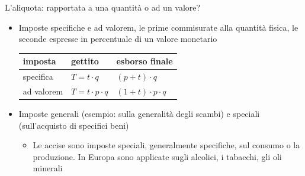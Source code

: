 \documentclass[11pt]{beamer}
\begin{document}
\begin{frame}{L'aliquota: rapportata a una quantità o ad un valore?}
\begin{itemize}
\item Imposte \alert{specifiche} e \alert{ad valorem}, le prime commisurate alla quantità
fisica, le seconde espresse in percentuale di un valore monetario
\begin{center}
\begin{tabular}{lll}
imposta & gettito & esborso finale\\[0pt]
\hline
specifica & $T = t\cdot q$ & $(p+t)\cdot q$\\[0pt]
ad valorem & $T = t\cdot p\cdot q$ & $(1+t)\cdot p\cdot q$\\[0pt]
\end{tabular}
\end{center}
\item Imposte \alert{generali} (esempio: sulla generalità degli scambi) e \alert{speciali}
(sull'acquisto di specifici beni)
\begin{itemize}
\item Le \alert{accise} sono imposte speciali, generalmente specifiche, sul consumo o
la produzione. In Europa sono applicate sugli alcolici, i tabacchi, gli
oli minerali
\end{itemize}
\end{itemize}
\end{frame}
\end{document}
